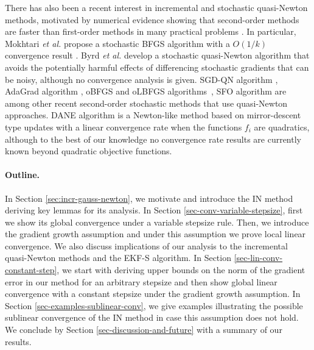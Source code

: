 \documentclass[final,numbook]{svjour3}
\begin{document}
There has also been a recent interest in incremental and stochastic quasi-Newton methods, motivated by numerical evidence showing that second-order methods are faster than first-order methods in many practical problems \cite{StocBFGSRibeiro14,StocBFGSNocedal14,Bordes2009sgdqn,Dickenstein2014}. 
In particular, Mokhtari \textit{et al.} propose a stochastic BFGS algorithm with a $O(1/k)$ convergence result \cite{StocBFGSRibeiro14}. Byrd \textit{et al.} \cite{StocBFGSNocedal14} develop a stochastic quasi-Newton algorithm that avoids the potentially harmful effects of differencing stochastic gradients that can be noisy, although no convergence analysis is given. SGD-QN algorithm \cite{Bordes2009sgdqn}, AdaGrad algorithm \cite{Duchi2011AdaGrad}, oBFGS and oLBFGS algorithms~\cite{Schraudolph2007stochastic}, SFO algorithm \cite{Dickenstein2014} are among other recent second-order stochastic methods that use quasi-Newton approaches. DANE algorithm \cite{SrebroDane2013} is a Newton-like method based on mirror-descent type updates with a linear convergence rate when the functions $f_i$ are quadratics, although to the best of our knowledge no convergence rate results are currently known beyond quadratic objective functions.
 
\paragraph{Outline.} In Section \ref{sec:incr-gauss-newton}, we motivate and introduce the IN method deriving key lemmas for its analysis. In Section \ref{sec-conv-variable-stepsize}, first we show its global convergence under a variable stepsize rule. Then, we introduce the gradient growth assumption and under this assumption we prove local linear convergence. We also discuss implications of our analysis to the incremental quasi-Newton methods and the EKF-S algorithm. In Section \ref{sec-lin-conv-constant-step}, we start with deriving upper bounds on the norm of the gradient error in our method for an arbitrary stepsize and then show global linear convergence with a constant stepsize under the gradient growth assumption. In Section \ref{sec-examples-sublinear-conv}, we give examples illustrating the possible sublinear convergence of the IN method in case this assumption does not hold. We conclude by Section \ref{sec-discussion-and-future} with a summary of our results.
\end{document}
